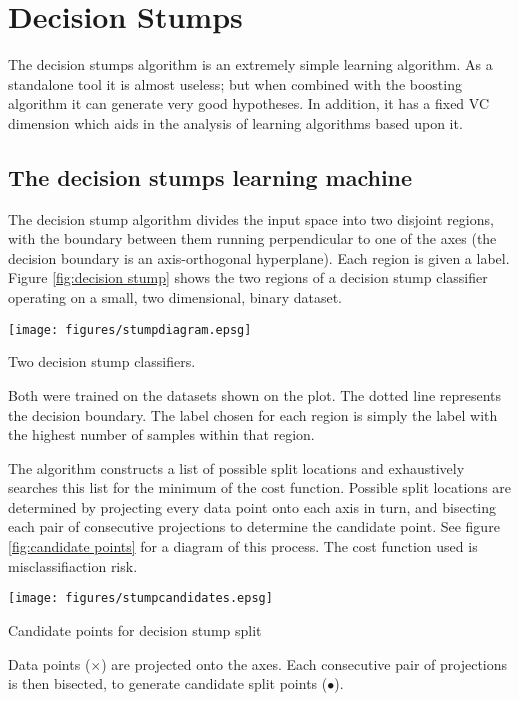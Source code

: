 
\chapter{Decision Stumps}

The decision stumps algorithm is an extremely simple learning
algorithm.  As a standalone tool it is almost useless; but when
combined with the boosting algorithm it can generate very good
hypotheses.  In addition, it has a fixed VC dimension which aids in
the analysis of learning algorithms based upon it.

\section{The decision stumps learning machine}

The decision stump algorithm divides the input space
into two disjoint regions, with the boundary between them running
perpendicular to one of the axes (the decision boundary is an
axis-orthogonal hyperplane).  Each region is given a label.
Figure \ref{fig:decision stump} shows the two regions of a decision
stump classifier operating on a small, two dimensional, binary
dataset.

\begin{linefigure}
\begin{center}
\texttt{[image: figures/stumpdiagram.epsg]}
\end{center}
\caption{Two decision stump classifiers.}
Both were trained on the datasets shown on the plot.  The dotted line
represents the decision boundary.  The label chosen for each region is
simply the label with the highest number of samples within that region.
\label{fig:decision stump}
\end{linefigure}

The algorithm constructs a list of possible split locations and
exhaustively searches this list for the minimum of the cost function.
Possible split locations are determined by projecting every data point
onto each axis in turn, and bisecting each pair of consecutive
projections to determine the candidate point.  See figure
\ref{fig:candidate points} for a diagram of this process.  The cost
function used is misclassifiaction risk.

\begin{linefigure}
\begin{center}
\texttt{[image: figures/stumpcandidates.epsg]}
\end{center}
\caption{Candidate points for decision stump split}
Data points ($\times$) are projected onto the axes.  Each consecutive
pair of projections is then bisected, to generate candidate split
points ($\bullet$).
\label{fig:candidate points}
\end{linefigure}


